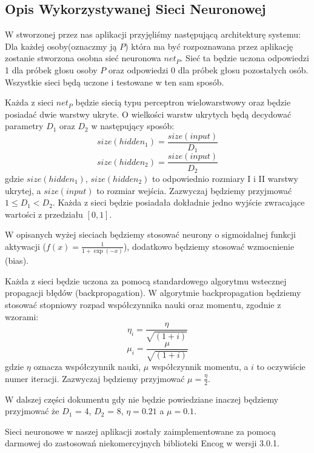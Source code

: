 \documentclass[a4paper]{article}
\begin{document}
	\subsection{Opis Wykorzystywanej Sieci Neuronowej}
	
	W stworzonej przez nas aplikacji przyjęliśmy następującą architekturę systemu:
	Dla każdej osoby(oznaczmy ją $P$) która ma być rozpoznawana przez aplikację zostanie stworzona osobna
	sieć neuronowa $net_P$. Sieć ta będzie uczona odpowiedzi 1 dla próbek głosu osoby $P$ oraz 
	odpowiedzi 0 dla próbek głosu pozostałych osób. 
	Wszystkie sieci będą uczone i testowane w ten sam sposób.  
	
	Każda z sieci $net_P$ będzie siecią typu perceptron wielowarstwowy oraz będzie posiadać
	dwie warstwy ukryte. O wielkości warstw ukrytych będą decydować parametry $D_1$ oraz $D_2$
	w następujący sposób:
	\[ size(hidden_1) = \frac{size(input)}{D_1} \]
	\[ size(hidden_2) = \frac{size(input)}{D_2} \] 
	gdzie $size(hidden_1)$, $size(hidden_2)$ to odpowiednio rozmiary I i II warstwy ukrytej,
	a $size(input)$ to rozmiar wejścia. Zazwyczaj będziemy przyjmować $1 \leq D_1 < D_2$.
	Każda z sieci będzie posiadała dokładnie jedno wyjście zwracające wartości z przedziału $[0, 1]$.
	
	W opisanych wyżej sieciach będziemy stosować neurony o sigmoidalnej funkcji aktywacji 
	($f(x) = \frac{1}{1+\exp(-x)}$), dodatkowo będziemy stosować wzmocnienie (bias).
	
	Każda z sieci będzie uczona za pomocą standardowego algorytmu wstecznej propagacji błędów
	(backpropagation). W algorytmie backpropagation będziemy stosować
	stopniowy rozpad współczynnika nauki oraz momentu, zgodnie z wzorami:
	\[ \eta_i = \frac{\eta}{\sqrt{(1 + i)}} \]
	\[ \mu_i = \frac{\mu}{\sqrt{(1 + i)}} \]
	gdzie $\eta$ oznacza współczynnik nauki, $\mu$ współczynnik
	momentu, a $i$ to oczywiście numer iteracji. Zazwyczaj będziemy przyjmować $\mu = \frac{\eta}{2}$.
	
	W dalszej części dokumentu gdy nie będzie powiedziane inaczej będziemy przyjmować
	że $D_1$ = 4, $D_2$ = 8, $\eta = 0.21$ a $\mu = 0.1$.
	
	Sieci neuronowe w naszej aplikacji zostały zaimplementowane za pomocą darmowej do
	zastosowań niekomercyjnych biblioteki Encog w wersji 3.0.1.
	
\end{document}
